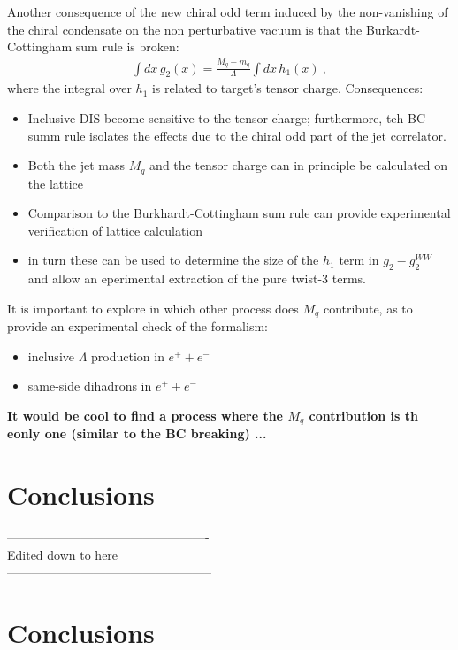\documentclass[preprintnumbers,floatfix,nofootinbib]{revtex4}
\newcommand{\todo}[1]{\marginpar{$\bullet$}\textbf{#1}}
\newcommand{\mj}{M_q}
\begin{document}
Another consequence of the new chiral odd term induced by the non-vanishing of
the chiral condensate on the non perturbative vacuum is that the
Burkardt-Cottingham sum rule is broken: 
\begin{align}
  \label{eq:BC}
  \int dx\, g_2(x) = \frac{\mj-m_q}{\Lambda} \int dx\, h_1(x) \ ,
\end{align}
where the integral over $h_1$ is related to target's tensor charge.
Consequences:
\begin{itemize}
\item Inclusive DIS become sensitive to the tensor charge; furthermore, teh BC summ rule isolates the effects due to the chiral odd part of the jet correlator. 
\item Both the jet mass $\mj$ and the tensor charge can in principle be calculated on the lattice
\item Comparison to the Burkhardt-Cottingham sum rule can provide experimental verification of lattice calculation
\item in turn these can be used to determine the size of the $h_1$ term in $g_2-g_2^{WW}$ and allow an eperimental extraction of the pure twist-3 terms.
\end{itemize}

It is important to explore in which other process does $\mj$ contribute, as to provide an experimental check of the formalism:
\begin{itemize}
\item inclusive $\Lambda$ production in $e^+ + e^-$
\item same-side dihadrons in $e^+ + e^-$ 
\end{itemize}
\todo{It would be cool to find a process where the $\mj$ contribution is th eonly one (similar to the BC breaking) ...}   


\section{Conclusions}

\noindent
------------------------------------------------- \\
Edited down to here\\
--------------------------------------------------\\


\section{Conclusions}
\end{document}
